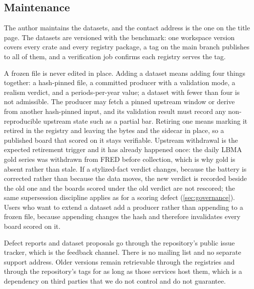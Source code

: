 \subsection{Maintenance}

The author maintains the datasets, and the contact address is the one on the title page. The datasets are versioned with the benchmark: one workspace version covers every crate and every registry package, a tag on the main branch publishes to all of them, and a verification job confirms each registry serves the tag.

A frozen file is never edited in place. Adding a dataset means adding four things together: a hash-pinned file, a committed producer with a validation mode, a realism verdict, and a periods-per-year value; a dataset with fewer than four is not admissible. The producer may fetch a pinned upstream window or derive from another hash-pinned input, and its validation result must record any non-reproducible upstream state such as a partial bar. Retiring one means marking it retired in the registry and leaving the bytes and the sidecar in place, so a published board that scored on it stays verifiable. Upstream withdrawal is the expected retirement trigger and it has already happened once: the daily LBMA gold series was withdrawn from FRED before collection, which is why gold is absent rather than stale. If a stylized-fact verdict changes, because the battery is corrected rather than because the data moves, the new verdict is recorded beside the old one and the boards scored under the old verdict are not rescored; the same supersession discipline applies as for a scoring defect (\cref{sec:governance}). Users who want to extend a dataset add a producer rather than appending to a frozen file, because appending changes the hash and therefore invalidates every board scored on it.

Defect reports and dataset proposals go through the repository's public issue tracker, which is the feedback channel. There is no mailing list and no separate support address. Older versions remain retrievable through the registries and through the repository's tags for as long as those services host them, which is a dependency on third parties that we do not control and do not guarantee.
